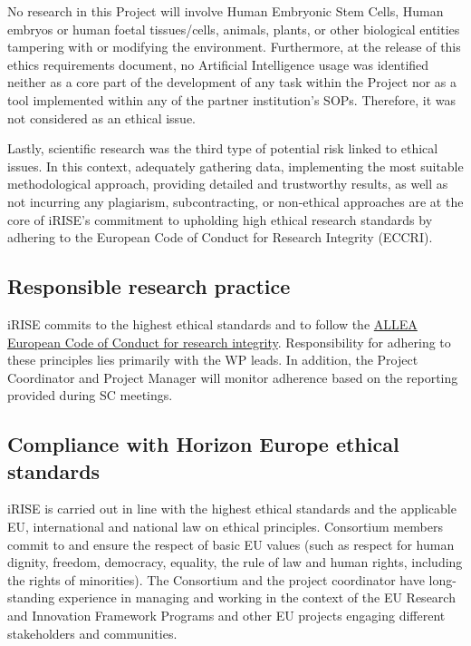 \documentclass[
]{article}
\begin{document}
No research in this Project will involve Human Embryonic Stem Cells, Human embryos or human foetal tissues/cells, animals, plants, or other biological entities tampering with or modifying the environment. Furthermore, at the release of this ethics requirements document, no Artificial Intelligence usage was identified neither as a core part of the development of any task within the Project nor as a tool implemented within any of the partner institution's SOPs. Therefore, it was not considered as an ethical issue.

Lastly, scientific research was the third type of potential risk linked to ethical issues. In this context, adequately gathering data, implementing the most suitable methodological approach, providing detailed and trustworthy results, as well as not incurring any plagiarism, subcontracting, or non-ethical approaches are at the core of iRISE's commitment to upholding high ethical research standards by adhering to the European Code of Conduct for Research Integrity (ECCRI).

\hypertarget{responsible-research-practice}{%
\subsection{Responsible research practice}\label{responsible-research-practice}}

iRISE commits to the highest ethical standards and to follow the \href{https://allea.org/wp-content/uploads/2023/06/European-Code-of-Conduct-Revised-Edition-2023.pdf}{ALLEA European Code of Conduct for research integrity}. Responsibility for adhering to these principles lies primarily with the WP leads. In addition, the Project Coordinator and Project Manager will monitor adherence based on the reporting provided during SC meetings.

\hypertarget{compliance-with-horizon-europe-ethical-standards}{%
\subsection{Compliance with Horizon Europe ethical standards}\label{compliance-with-horizon-europe-ethical-standards}}

iRISE is carried out in line with the highest ethical standards and the applicable EU, international and national law on ethical principles. Consortium members commit to and ensure the respect of basic EU values (such as respect for human dignity, freedom, democracy, equality, the rule of law and human rights, including the rights of minorities). The Consortium and the project coordinator have long-standing experience in managing and working in the context of the EU Research and Innovation Framework Programs and other EU projects engaging different stakeholders and communities.
\end{document}
